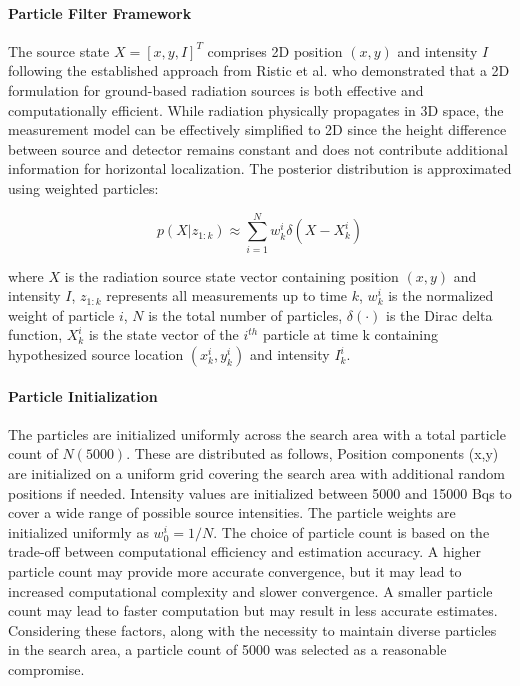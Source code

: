 \documentclass[../report.tex]{subfiles}
\begin{document}
    \paragraph{Particle Filter Framework}
    The source state $X = [x, y, I]^T$ comprises 2D position $(x,y)$ and intensity $I$ following the established approach from Ristic et al. who demonstrated that a 2D formulation for ground-based 
    radiation sources is both effective and computationally efficient. While radiation physically propagates in 3D space, the measurement model can be effectively simplified to 2D since the height
    difference between source and detector remains constant and does not contribute additional information for horizontal localization. 
    The posterior distribution is approximated using weighted particles:

    \begin{equation}
    p(X|z_{1:k}) \approx \sum_{i=1}^N w_k^i \delta(X - X_k^i)
    \end{equation}

    where $X$ is the radiation source state vector containing position $(x,y)$ and intensity $I$, $z_{1:k}$ represents all measurements up to time $k$, $w_k^i$ is the normalized weight of 
    particle $i$, $N$ is the total number of particles, $\delta(\cdot)$ is the Dirac delta function, $X_k^i$ is the state vector of the $i^{th}$ particle at time k containing
    hypothesized source location $(x_k^i, y_k^i)$ and intensity $I_k^i$. 

    \paragraph{Particle Initialization}
    The particles are initialized uniformly across the search area with a total particle count of $N (5000)$. These are distributed as follows, Position components (x,y) are initialized on a 
    uniform grid covering the search area with additional random positions if needed. Intensity values are initialized between 5000 and 15000 Bqs to cover a wide range of 
    possible source intensities. The particle weights are initialized uniformly as $w_0^i = 1/N$. The choice of particle count is based on the trade-off 
    between computational efficiency and estimation accuracy. A higher particle count may provide more accurate convergence, but it may lead to increased 
    computational complexity and slower convergence. A smaller particle count may lead to faster computation but may result in less accurate estimates. Considering 
    these factors, along with the necessity to maintain diverse particles in the search area, a particle count of 5000 was selected as a reasonable compromise.
\end{document}
